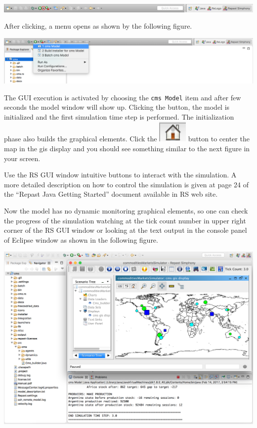 \documentclass{article}
\begin{document}
\vskip2mm
\noindent
\includegraphics[scale=0.35]{fig_cms_rs_execution1}

After clicking, a menu opens as shown by the following figure. 

\vskip2mm
\noindent
\includegraphics[scale=0.35]{fig_cms_rs_execution2}

\vskip2mm
The GUI execution is activated by choosing the \verb+cms Model+ item and after few seconds the model window will show up. Clicking the  button, the model is initialized and the first simulation time step is performed. The initialization phase also builds the graphical elements. Click the \includegraphics[scale=0.4]{fig_home} button to center the map in the gis display and you should see something similar to the next figure in your screen.

Use the RS GUI window intuitive buttons to interact with the simulation. A more detailed description on how to control the simulation is given at page 24 of the ``Repast Java Getting Started'' document available in RS web site.

Now the model has no dynamic monitoring graphical elements, so one can check the progress of the simulation watching at the tick count number in upper right corner of the RS GUI window or looking at the text output in the console panel of Eclipse window as shown in the following figure. 

\vskip2mm
\noindent
\includegraphics[scale=0.35]{fig_cms_rs_gui7}
\end{document}
